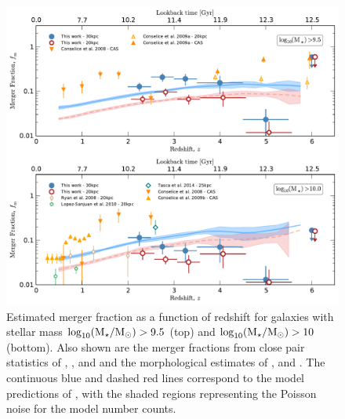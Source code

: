 \begin{figure}
\centering
	\includegraphics[width=\columnwidth]{plots/merger_fractions.pdf}
  \caption[Estimated merger fraction as a function of redshift.]{Estimated merger fraction as a function of redshift for galaxies with stellar mass $\log_{10}(\text{M}_{\star} / \text{M}_{\odot}) > 9.5$ (top) and $\log_{10}(\text{M}_{\star} / \text{M}_{\odot}) > 10$ (bottom). Also shown are the merger fractions from close pair statistics of \citet{RyanJr:2008ka}, \citet{2009MNRAS.397..208C}, \citet{LopezSanjuan:2010cz} and \citet{Tasca:2014gz} and the morphological estimates of \citet{Conselice:2008de},  \citet{2009MNRAS.397..208C} and \citet{Conselice:2009fe}. The continuous blue and dashed red lines correspond to the model predictions of \citet{Lu:2011hj,Lu:2014kl}, with the shaded regions representing the Poisson noise for the model number counts.}
  \label{merger-fig:merger_frac}
\end{figure}

